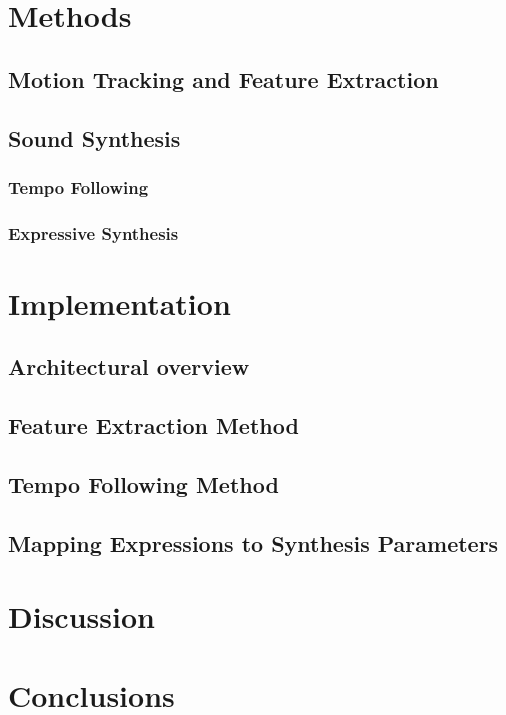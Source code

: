 \chapter{Methods}
\label{chapter:methods}

\section{Motion Tracking and Feature Extraction}

\section{Sound Synthesis}

\subsection{Tempo Following}

\subsection{Expressive Synthesis}

\chapter{Implementation}
\label{chapter:implementation}

\section{Architectural overview}

\section{Feature Extraction Method}

\section{Tempo Following Method}

\section{Mapping Expressions to Synthesis Parameters}

\chapter{Discussion}
\label{chapter:discussion}

\chapter{Conclusions}
\label{chapter:conclusions}



